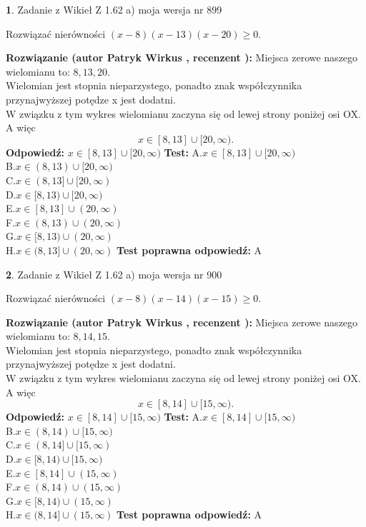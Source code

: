 \documentclass[12pt, a4paper]{article}
\theoremstyle{definition} %
\newtheorem{zad}{}
\newcommand{\zadStart}[1]{\begin{zad}#1\newline}
\newcommand{\zadStop}{\end{zad}}
\newcommand{\rozwStart}[2]{\noindent \textbf{Rozwiązanie (autor #1 , recenzent #2): }\newline}
\newcommand{\rozwStop}{\newline}
\newcommand{\odpStart}{\noindent \textbf{Odpowiedź:}\newline}
\newcommand{\odpStop}{\newline}
\newcommand{\testStart}{\noindent \textbf{Test:}\newline}
\newcommand{\testStop}{\newline}
\newcommand{\kluczStart}{\noindent \textbf{Test poprawna odpowiedź:}\newline}
\newcommand{\kluczStop}{\newline}
\begin{document}
\zadStart{Zadanie z Wikieł Z 1.62 a) moja wersja nr 899}

Rozwiązać nierówności $(x-8)(x-13)(x-20)\ge0$.
\zadStop
\rozwStart{Patryk Wirkus}{}
Miejsca zerowe naszego wielomianu to: $8, 13, 20$.\\
Wielomian jest stopnia nieparzystego, ponadto znak współczynnika przy\linebreak najwyższej potędze x jest dodatni.\\ W związku z tym wykres wielomianu zaczyna się od lewej strony poniżej osi OX. A więc $$x \in [8,13] \cup [20,\infty).$$
\rozwStop
\odpStart
$x \in [8,13] \cup [20,\infty)$
\odpStop
\testStart
A.$x \in [8,13] \cup [20,\infty)$\\
B.$x \in (8,13) \cup [20,\infty)$\\
C.$x \in (8,13] \cup [20,\infty)$\\
D.$x \in [8,13) \cup [20,\infty)$\\
E.$x \in [8,13] \cup (20,\infty)$\\
F.$x \in (8,13) \cup (20,\infty)$\\
G.$x \in [8,13) \cup (20,\infty)$\\
H.$x \in (8,13] \cup (20,\infty)$
\testStop
\kluczStart
A
\kluczStop



\zadStart{Zadanie z Wikieł Z 1.62 a) moja wersja nr 900}

Rozwiązać nierówności $(x-8)(x-14)(x-15)\ge0$.
\zadStop
\rozwStart{Patryk Wirkus}{}
Miejsca zerowe naszego wielomianu to: $8, 14, 15$.\\
Wielomian jest stopnia nieparzystego, ponadto znak współczynnika przy\linebreak najwyższej potędze x jest dodatni.\\ W związku z tym wykres wielomianu zaczyna się od lewej strony poniżej osi OX. A więc $$x \in [8,14] \cup [15,\infty).$$
\rozwStop
\odpStart
$x \in [8,14] \cup [15,\infty)$
\odpStop
\testStart
A.$x \in [8,14] \cup [15,\infty)$\\
B.$x \in (8,14) \cup [15,\infty)$\\
C.$x \in (8,14] \cup [15,\infty)$\\
D.$x \in [8,14) \cup [15,\infty)$\\
E.$x \in [8,14] \cup (15,\infty)$\\
F.$x \in (8,14) \cup (15,\infty)$\\
G.$x \in [8,14) \cup (15,\infty)$\\
H.$x \in (8,14] \cup (15,\infty)$
\testStop
\kluczStart
A
\kluczStop
\end{document}
